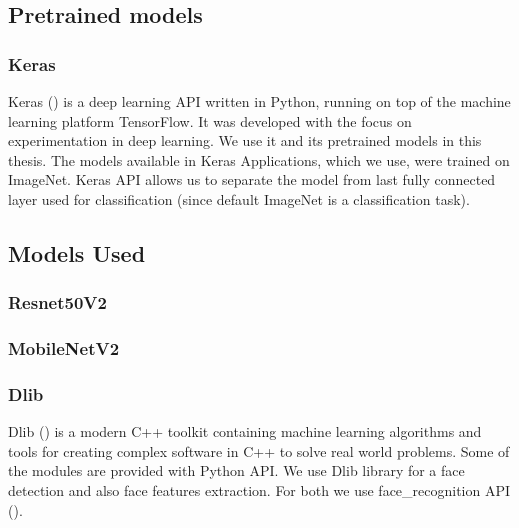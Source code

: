 \subsection{Pretrained models}

\subsubsection{Keras}

Keras (\cite{chollet2015keras}) is a deep learning API written in Python, running on top of the machine learning platform TensorFlow\cite{tensorflow2015-whitepaper}. It was developed with the focus on experimentation in deep learning. We use it and its pretrained models in this thesis. The models available in Keras Applications, which we use, were trained on ImageNet. Keras API allows us to separate the model from last fully connected layer used for classification (since default ImageNet is a classification task). 

\subsection{Models Used}

\subsubsection*{Resnet50V2}
\cite{resnetv2} \cite{resnet}

\subsubsection*{MobileNetV2}
\cite{mobilenet} \cite{mobilenetv2}

\subsubsection{Dlib}
Dlib (\cite{king2009dlib}) is a modern C++ toolkit containing machine learning algorithms and tools for creating complex software in C++ to solve real world problems. Some of the modules are provided with Python API. We use Dlib library for a face detection and also face features extraction. For both we use face\_recognition API (\cite{geitgey2016machine}). \cite{king2017high} 




